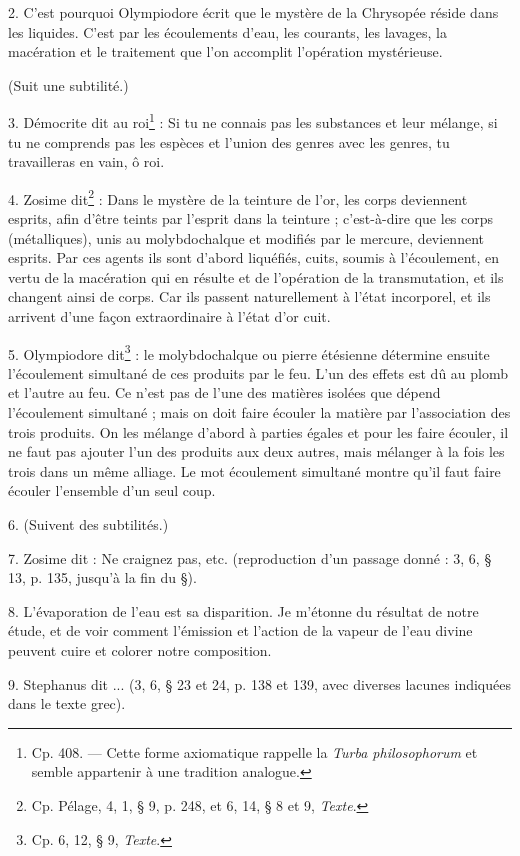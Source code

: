 \documentclass[a4paper, 11pt, oneside, polutonikogreek, french]{article}
\begin{document}
2. C'est pourquoi Olympiodore écrit que le mystère de la Chrysopée réside dans les liquides. C'est par les écoulements d'eau, les courants, les lavages, la macération et le traitement que l'on accomplit l'opération mystérieuse.

(Suit une subtilité.)

3. Démocrite dit au roi\footnote{Cp. 408. --- Cette forme axiomatique rappelle la \emph{Turba philosophorum} et semble appartenir à une tradition analogue.} : Si tu ne connais pas les substances et leur mélange, si tu ne comprends pas les espèces et l'union des genres avec les genres, tu travailleras en vain, ô roi.

4. Zosime dit\footnote{Cp. Pélage, 4, 1, § 9, p. 248, et 6, 14, § 8 et 9, \emph{Texte}.} : Dans le mystère de la teinture de l'or, les corps deviennent esprits, afin d'être teints par l'esprit dans la teinture ; c'est-à-dire que les corps (métalliques), unis au molybdochalque et modifiés par le mercure, deviennent esprits. Par ces agents ils sont d'abord liquéfiés, cuits, soumis à l'écoulement, en vertu de la macération qui en résulte et de l'opération de la transmutation, et ils changent ainsi de corps. Car ils passent naturellement à l'état incorporel, et ils arrivent d'une façon extraordinaire à l'état d'or cuit.

5. Olympiodore dit\footnote{Cp. 6, 12, § 9, \emph{Texte}.} : le molybdochalque ou pierre étésienne détermine ensuite l'écoulement simultané de ces produits par le feu. L'un des effets est dû au plomb et l'autre au feu. Ce n'est pas de l'une des matières isolées que dépend l'écoulement simultané ; mais on doit faire écouler la matière par l'association des trois produits. On les mélange d'abord à parties égales et pour les faire écouler, il ne faut pas ajouter l'un des produits aux deux autres, mais mélanger à la fois les trois dans un même alliage. Le mot écoulement simultané montre qu'il faut faire écouler l'ensemble d'un seul coup.

6. (Suivent des subtilités.)

7. Zosime dit : Ne craignez pas, etc. (reproduction d'un passage donné : 3, 6, § 13, p. 135, jusqu'à la fin du §).

8. L'évaporation de l'eau est sa disparition. Je m'étonne du résultat de notre étude, et de voir comment l'émission et l'action de la vapeur de l'eau divine peuvent cuire et colorer notre composition.

9. Stephanus dit ... (3, 6, § 23 et 24, p. 138 et 139, avec diverses lacunes indiquées dans le texte grec).
\end{document}
